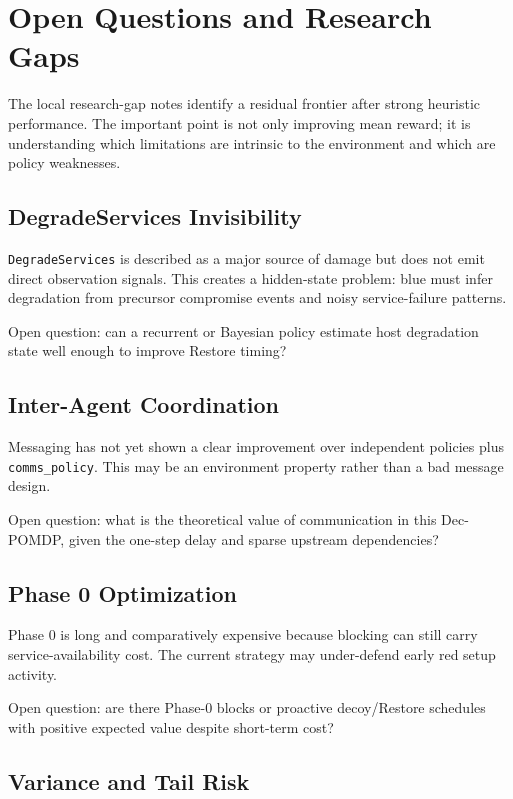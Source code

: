 \section{Open Questions and Research Gaps}

The local research-gap notes identify a residual frontier after strong heuristic performance. The important point is not only improving mean reward; it is understanding which limitations are intrinsic to the environment and which are policy weaknesses.

\subsection{DegradeServices Invisibility}

\texttt{DegradeServices} is described as a major source of damage but does not emit direct observation signals. This creates a hidden-state problem: blue must infer degradation from precursor compromise events and noisy service-failure patterns.

Open question: can a recurrent or Bayesian policy estimate host degradation state well enough to improve Restore timing?

\subsection{Inter-Agent Coordination}

Messaging has not yet shown a clear improvement over independent policies plus \texttt{comms\_policy}. This may be an environment property rather than a bad message design.

Open question: what is the theoretical value of communication in this Dec-POMDP, given the one-step delay and sparse upstream dependencies?

\subsection{Phase 0 Optimization}

Phase 0 is long and comparatively expensive because blocking can still carry service-availability cost. The current strategy may under-defend early red setup activity.

Open question: are there Phase-0 blocks or proactive decoy/Restore schedules with positive expected value despite short-term cost?

\subsection{Variance and Tail Risk}

